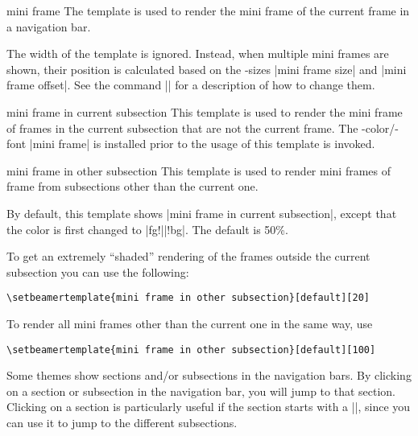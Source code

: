 \begin{element}{mini frame}\yes\yes\yes
  The template is used to render the mini frame of the current frame
  in a navigation bar.

  The width of the template is ignored. Instead, when multiple mini
  frames are shown, their position is calculated based on the
  \beamer-sizes |mini frame size| and |mini frame offset|. See the
  command |\setbeamersize| for a description of how to change them.
\end{element}

\begin{element}{mini frame in current subsection}\yes\no\no
  This template is used to render the mini frame of frames in the
  current subsection that are not the current frame. The
  \beamer-color/-font |mini frame| is installed prior to the usage of
  this template is invoked.
\end{element}

\begin{element}{mini frame in other subsection}\yes\no\no
  This template is used to render mini frames of frame from
  subsections other than the current one.
  \begin{templateoptions}
    By default, this template shows |mini frame in current subsection|, except that the color is first
    changed to |fg!||!bg|. The default
     is 50\%.

    \example To get an extremely ``shaded'' rendering of the frames
    outside the current subsection you can use the following:
\begin{verbatim}
\setbeamertemplate{mini frame in other subsection}[default][20]
\end{verbatim}

    \example To render all mini frames other than the current one in
    the same way, use
\begin{verbatim}
\setbeamertemplate{mini frame in other subsection}[default][100]
\end{verbatim}
  \end{templateoptions}
\end{element}



Some themes show sections and/or subsections in the navigation bars.
By clicking on a section or subsection in the navigation bar, you will
jump to that section. Clicking on a section is particularly useful if
the section starts with a |\tableofcontents[currentsection]|, since you
can use it to jump to the different subsections.

